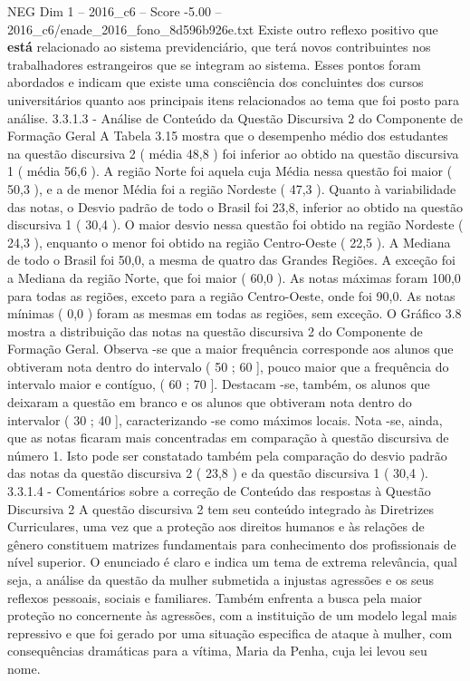 \begin{textsample}{NEG Dim 1 – 2016\_c6 – Score -5.00 – 2016\_c6/enade\_2016\_fono\_8d596b926e.txt}
Existe outro reflexo positivo que \textbf{está} relacionado ao sistema previdenciário, que terá novos contribuintes nos trabalhadores estrangeiros que se integram ao sistema.
Esses pontos foram abordados e indicam que existe uma consciência dos concluintes dos cursos universitários quanto aos principais itens relacionados ao tema que foi posto para análise. 3.3.1.3 - Análise de Conteúdo da Questão Discursiva 2 do Componente de Formação Geral A Tabela 3.15 mostra que o desempenho médio dos estudantes na questão discursiva 2 ( média 48,8 ) foi inferior ao obtido na questão discursiva 1 ( média 56,6 ).
A região Norte foi aquela cuja Média nessa questão foi maior ( 50,3 ), e a de menor Média foi a região Nordeste ( 47,3 ).
Quanto à variabilidade das notas, o Desvio padrão de todo o Brasil foi 23,8, inferior ao obtido na questão discursiva 1 ( 30,4 ).
O maior desvio nessa questão foi obtido na região Nordeste ( 24,3 ), enquanto o menor foi obtido na região Centro-Oeste ( 22,5 ).
A Mediana de todo o Brasil foi 50,0, a mesma de quatro das Grandes Regiões.
A exceção foi a Mediana da região Norte, que foi maior ( 60,0 ).
As notas máximas foram 100,0 para todas as regiões, exceto para a região Centro-Oeste, onde foi 90,0.
As notas mínimas ( 0,0 ) foram as mesmas em todas as regiões, sem exceção.
O Gráfico 3.8 mostra a distribuição das notas na questão discursiva 2 do Componente de Formação Geral.
Observa -se que a maior frequência corresponde aos alunos que obtiveram nota dentro do intervalo ( 50 ; 60 ], pouco maior que a frequência do intervalo maior e contíguo, ( 60 ; 70 ].
Destacam -se, também, os alunos que deixaram a questão em branco e os alunos que obtiveram nota dentro do intervalor ( 30 ; 40 ], caracterizando -se como máximos locais.
Nota -se, ainda, que as notas ficaram mais concentradas em comparação à questão discursiva de número 1.
Isto pode ser constatado também pela comparação do desvio padrão das notas da questão discursiva 2 ( 23,8 ) e da questão discursiva 1 ( 30,4 ). 3.3.1.4 - Comentários sobre a correção de Conteúdo das respostas à Questão Discursiva 2 A questão discursiva 2 tem seu conteúdo integrado às Diretrizes Curriculares, uma vez que a proteção aos direitos humanos e às relações de gênero constituem matrizes fundamentais para conhecimento dos profissionais de nível superior.
O enunciado é claro e indica um tema de extrema relevância, qual seja, a análise da questão da mulher submetida a injustas agressões e os seus reflexos pessoais, sociais e familiares.
Também enfrenta a busca pela maior proteção no concernente às agressões, com a instituição de um modelo legal mais repressivo e que foi gerado por uma situação especifica de ataque à mulher, com consequências dramáticas para a vítima, Maria da Penha, cuja lei levou seu nome.

\end{textsample}
